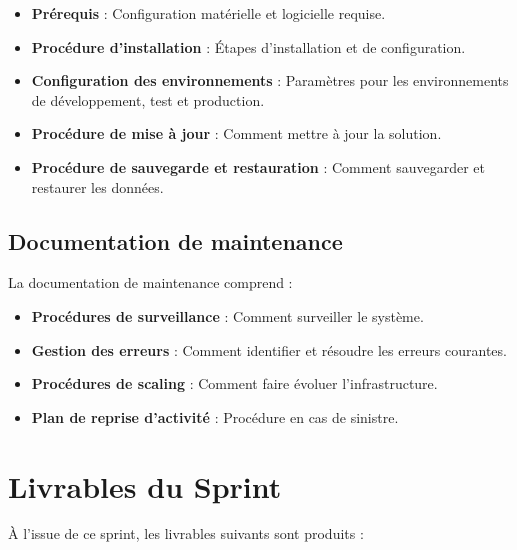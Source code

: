 \begin{itemize}
    \item \textbf{Prérequis} : Configuration matérielle et logicielle requise.
    \item \textbf{Procédure d'installation} : Étapes d'installation et de configuration.
    \item \textbf{Configuration des environnements} : Paramètres pour les environnements de développement, test et production.
    \item \textbf{Procédure de mise à jour} : Comment mettre à jour la solution.
    \item \textbf{Procédure de sauvegarde et restauration} : Comment sauvegarder et restaurer les données.
\end{itemize}

\subsection{Documentation de maintenance}

La documentation de maintenance comprend :

\begin{itemize}
    \item \textbf{Procédures de surveillance} : Comment surveiller le système.
    \item \textbf{Gestion des erreurs} : Comment identifier et résoudre les erreurs courantes.
    \item \textbf{Procédures de scaling} : Comment faire évoluer l'infrastructure.
    \item \textbf{Plan de reprise d'activité} : Procédure en cas de sinistre.
\end{itemize}

\section{Livrables du Sprint}
\label{sec:sprint8-livrables}

À l'issue de ce sprint, les livrables suivants sont produits :

